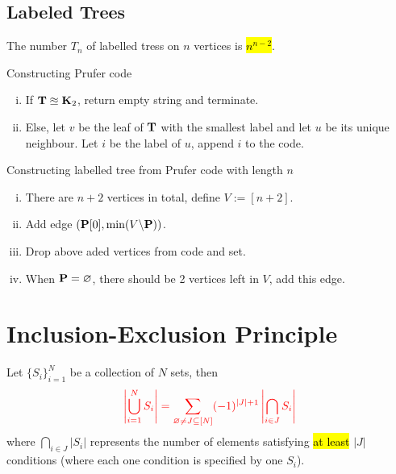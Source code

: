 \documentclass{article}
\begin{document}
		\subsection{Labeled Trees}
			\begin{theorem}
				The number $T_n$ of labelled tress on $n$ vertices is \hl{$n^{n-2}$}.
			\end{theorem}
			
			\begin{definition}Constructing Prufer code
				\begin{enumerate}[(i)]
					\item If $\textbf{T} \approxeq \textbf{K}_2$, return empty string and terminate.
					\item Else, let $v$ be the leaf of $\textbf{T}$ with the smallest label and let $u$ be its unique neighbour. Let $i$ be the label of $u$, append $i$ to the code.
				\end{enumerate}
			\end{definition}
			
			\begin{theorem}Constructing labelled tree from Prufer code  with length $n$
				\begin{enumerate}[(i)]
					\item There are $n+2$ vertices in total, define $V := [n+2]$.
					\item Add edge $(\textbf{P}[0], \min(V \backslash \textbf{P}))$.
					\item Drop above aded vertices from code and set.
					\item When $\textbf{P} = \varnothing$, there should be 2 vertices left in $V$, add this edge.
				\end{enumerate}
			\end{theorem}
		
		\section{Inclusion-Exclusion Principle}
			\begin{theorem}
				Let $\{S_i\}_{i=1}^N$ be a collection of $N$ sets, then
				\begin{equation}
				\textcolor{red}{
					\left\vert \bigcup_{i=1}^N S_i \right\vert = \sum_{\varnothing \neq J \subseteq [N]} (-1)^{|J|+1} \left\vert \bigcap_{i \in J} S_i \right\vert
				}
				\end{equation}
				where $\bigcap_{i \in J} \left\vert S_i \right\vert$ represents the number of elements satisfying \hl{at least} $|J|$ conditions (where each one condition is specified by one $S_i$).
			\end{theorem}
		
\end{document}
